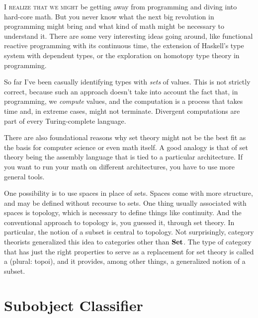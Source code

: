 
\lettrine[lhang=0.17]{I}{ realize that we might} be getting away from programming and diving into
hard-core math. But you never know what the next big revolution in
programming might bring and what kind of math might be necessary to
understand it. There are some very interesting ideas going around, like
functional reactive programming with its continuous time, the extension
of Haskell's type system with dependent types, or the exploration on
homotopy type theory in programming.

So far I've been casually identifying types with \emph{sets} of values.
This is not strictly correct, because such an approach doesn't take into
account the fact that, in programming, we \emph{compute} values, and the
computation is a process that takes time and, in extreme cases, might
not terminate. Divergent computations are part of every Turing-complete
language.

There are also foundational reasons why set theory might not be the best
fit as the basis for computer science or even math itself. A good
analogy is that of set theory being the assembly language that is tied
to a particular architecture. If you want to run your math on different
architectures, you have to use more general tools.

One possibility is to use spaces in place of sets. Spaces come with more
structure, and may be defined without recourse to sets. One thing
usually associated with spaces is topology, which is necessary to define
things like continuity. And the conventional approach to topology is,
you guessed it, through set theory. In particular, the notion of a
subset is central to topology. Not surprisingly, category theorists
generalized this idea to categories other than $\mathbf{Set}$. The type of
category that has just the right properties to serve as a replacement
for set theory is called a  (plural: topoi), and it
provides, among other things, a generalized notion of a subset.

\section{Subobject Classifier}


